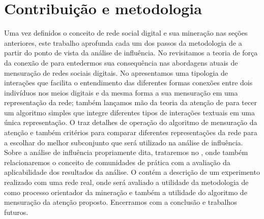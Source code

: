 \section{Contribuição e metodologia}

Uma vez definidos o conceito de rede social digital e sua mineração nas seções
anteriores, este trabalho aprofunda cada um dos passos da metodologia de
\citeauthor{Cios2005} a partir do ponto de vista da análise de influência. No
 revisitamos a teoria de força da conexão de
\citeauthor{Granovetter1973} para entedermos sua consequência nas abordagens
atuais de mensuração de redes sociais digitais. No 
apresentamos uma tipologia de interações que facilita o entendimento das
diferentes formas conexões entre dois indivíduos nos meios digitais e da mesma
forma a sua mensuração em uma representação da rede; também lançamos mão da
teoria da atenção de \citeauthor{Davenport2001} para tecer um algoritmo simples
que integre diferentes tipos de interações textuais em uma única representação.
O  traz detalhes de operação do algoritmo de mensuração
da atenção e também critérios para comparar diferentes representações da rede
para a escolhar do melhor subconjunto que será utilizado na análise de
influência. Sobre a análise de influência propriamente dita, trataremos no
, onde também relacionaremos o conceito de comunidades de
prática com a avaliação da aplicabilidade dos resultados da análise. O
 contém a descrição de um experimento realizado com uma rede
real, onde será avaliado a utilidade da metodologia de \citeauthor{Cios2005}
como processo orientador da mineração e também a utilidade do algoritmo de
mensuração da atenção proposto. Encerramos com a conclusão e trabalhos futuros.